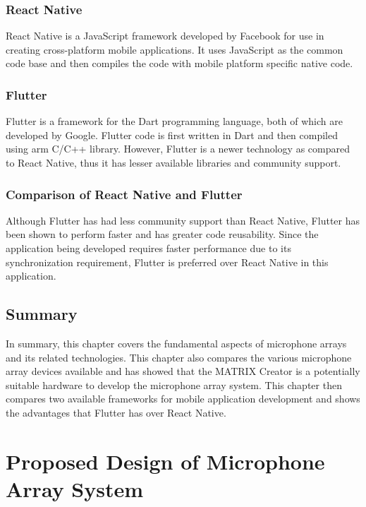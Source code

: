 \documentclass[hidelinks,12pt]{report} %
\begin{document}
\subsection{React Native}

React Native is a JavaScript framework developed by Facebook for use in creating cross-platform mobile applications. It uses JavaScript as the common code base and then compiles the code with mobile platform specific native code\cite{42}.

\subsection{Flutter}

Flutter is a framework for the Dart programming language, both of which are developed by Google. Flutter code is first written in Dart and then compiled using arm C/C++ library. However, Flutter is a newer technology as compared to React Native, thus it has lesser available libraries and community support\cite{43}.

\subsection{Comparison of React Native and Flutter}

Although Flutter has had less community support than React Native, Flutter has been shown to perform faster and has greater code reusability\cite{26}. Since the application being developed requires faster performance due to its synchronization requirement, Flutter is preferred over React Native in this application.

\section{Summary}

In summary, this chapter covers the fundamental aspects of microphone arrays and its related technologies. This chapter also compares the various microphone array devices available and has showed that the MATRIX Creator is a potentially suitable hardware to develop the microphone array system. 
This chapter then compares two available frameworks for mobile application development and shows the advantages that Flutter has over React Native.



\chapter{Proposed Design of Microphone Array System}
\end{document}
